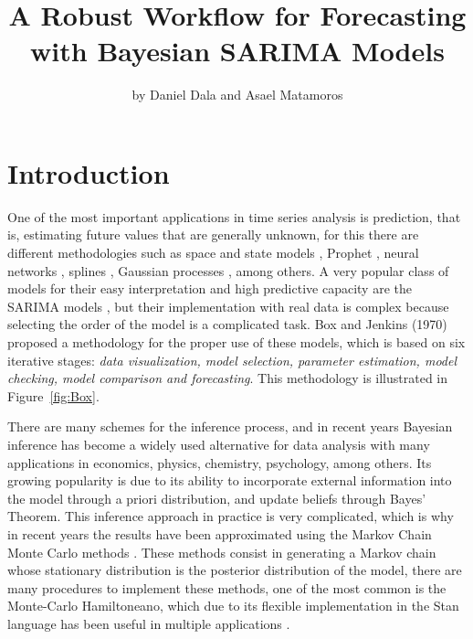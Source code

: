 \title{A Robust Workflow for Forecasting with Bayesian SARIMA Models}
\author{by Daniel Dala and Asael Matamoros}

\maketitle

%
\section{Introduction}
One of the most important applications in time series analysis is prediction, that is, estimating future values that are generally unknown, for this there are different methodologies such as space and state models \citet{rob}, Prophet  \citet{ref2}, neural networks \citet{ref3}, splines \citet{ref4}, Gaussian processes  \citet{ref5}, among others. A very popular class of models for their easy interpretation and high predictive capacity are the SARIMA models \citet{arima,sarima}, but their implementation with real data is complex because selecting the order of the model is a complicated task. Box and Jenkins (1970) proposed a methodology for the proper use of these models, which is based on six iterative stages:\textit{ data visualization, model selection, parameter estimation, model checking, model comparison and forecasting}. This methodology is illustrated in Figure~\ref{fig:Box}.

There are many schemes for the inference process, and in recent years Bayesian inference has become a widely used alternative for data analysis with many applications in economics, physics, chemistry, psychology, among others. Its growing popularity is due to its ability to incorporate external information into the model through a priori distribution, and update beliefs through Bayes' Theorem. This inference approach in practice is very complicated, which is why in recent years the results have been approximated using the Markov Chain Monte Carlo methods  \citet{MCMC}. These methods consist in generating a Markov chain whose stationary distribution is the posterior distribution of the model, there are many procedures to implement these methods, one of the most common is the Monte-Carlo Hamiltoneano, which due to its flexible implementation in the Stan language has been useful in multiple applications \cite{Stan}.

